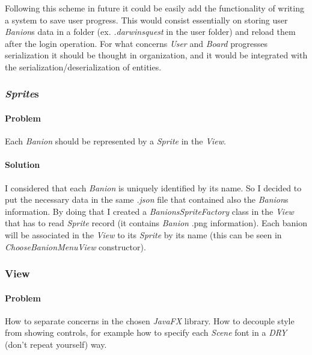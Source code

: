 \documentclass[12pt, a4paper]{report}
\begin{document}
            Following this scheme in future it could be easily add the functionality of writing a system to save user progress.
            This would consist essentially on storing user \emph{Banion}s data in a folder (ex. \emph{.darwinsquest} in the user folder) and reload them after the login operation.
            For what concerns \emph{User} and \emph{Board} progresses serialization it should be thought in organization, and it would be integrated with the serialization/deserialization of entities.

        \subsubsection{\emph{Sprite}s}

            \paragraph{Problem}

            Each \emph{Banion} should be represented by a \emph{Sprite} in the \emph{View}.

            \paragraph{Solution}

            I considered that each \emph{Banion} is uniquely identified by its name.
            So I decided to put the necessary data in the same \textit{.json} file that contained also the \emph{Banion}s information.
            By doing that I created a \emph{BanionsSpriteFactory} class in the \emph{View} that has to read \emph{Sprite} record (it contains \emph{Banion} .png information).
            Each banion will be associated in the \emph{View} to its \emph{Sprite} by its name (this can be seen in \emph{ChooseBanionMenuView} constructor).

        \subsubsection{View}

            \paragraph{Problem}

            How to separate concerns in the chosen \emph{JavaFX} library.
            How to decouple style from showing controls, for example how to specify each \emph{Scene} font in a \emph{DRY} (don't repeat yourself) way.
\end{document}
